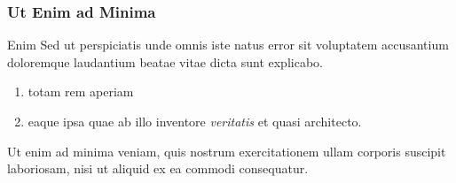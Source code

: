 \documentclass{beamer}
\begin{document}
\begin{frame}
  

\end{frame}


\begin{frame}
  \frametitle{Ut Enim ad Minima}
  
  {\large\begin{block}{Enim}
      Sed ut perspiciatis unde omnis iste natus error sit voluptatem accusantium doloremque laudantium beatae vitae dicta sunt explicabo.
      \vspace{3pt}
      \begin{enumerate}
        \setlength\itemsep{5pt}
      \item totam rem aperiam
      \item eaque ipsa quae ab illo inventore \emph{veritatis} et quasi architecto.
      \end{enumerate}
    \end{block}

    \begin{theorem}
      Ut enim ad minima veniam, quis nostrum exercitationem ullam corporis suscipit laboriosam, nisi ut aliquid ex ea commodi consequatur.
    \end{theorem}
  }
\end{frame}

\end{document}
